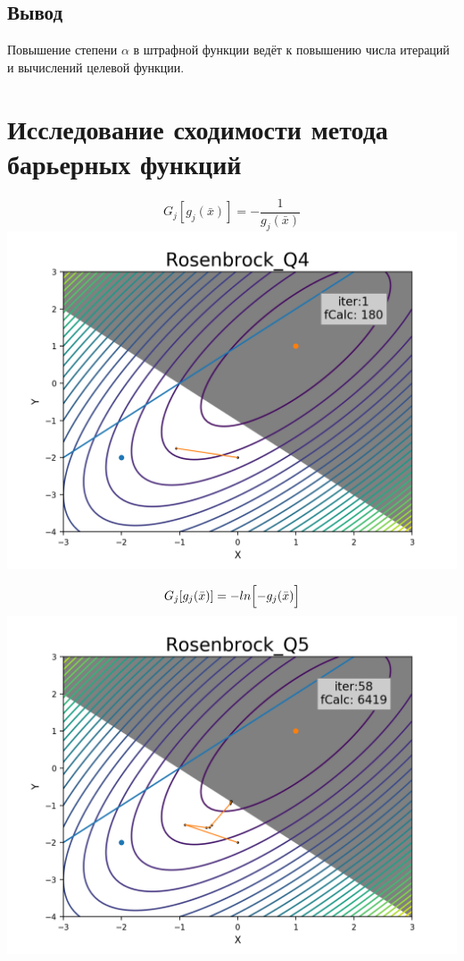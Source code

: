 \documentclass[12pt, a4paper]{article}
\newcommand{\funcGFour}[0]{
\[ G_j[g_j({\bar x})] = {-\frac {1}{ g_j({\bar x}) } } \] }
\newcommand{\funcGFive}[0]{
\[ G_j[g_j({\bar x})] = {-ln \Bigl[{-g_j({\bar x})} \Bigr] } \] }
\newcommand{\picSize}{0.7}
\begin{document}
\subsection{Вывод}

Повышение степени ${ \alpha }$ в штрафной функции ведёт к повышению числа итераций и вычислений целевой функции.




\section{Исследование сходимости метода барьерных функций}

\funcGFour{}
\includegraphics[width=\picSize\linewidth]{../pics/Rosenbrock_Q4.png}
\funcGFive{}
\includegraphics[width=\picSize\linewidth]{../pics/Rosenbrock_Q5.png}
\end{document}
